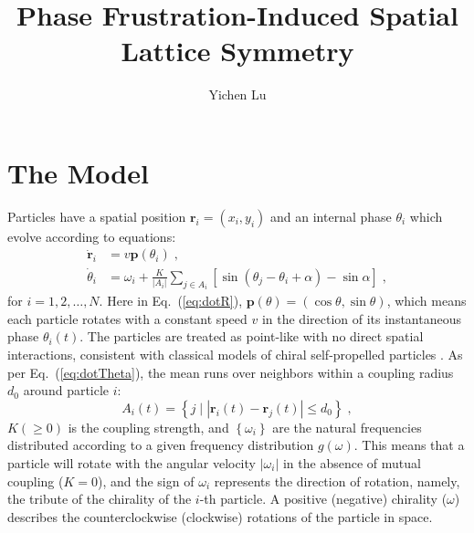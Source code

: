 \documentclass{article}
\title{\textbf{Phase Frustration-Induced Spatial Lattice Symmetry}}
\author{Yichen Lu}
\begin{document}
\maketitle

\tableofcontents

\section{The Model}

Particles have a spatial position $\mathbf{r}_i=\left( x_i, y_i \right)$ and an internal phase $\theta_i$ which evolve according to equations:
\begin{subequations} 
    \label{eq:totalDynamicsMeanField}
    \begin{align}
        \dot{\mathbf{r}}_i&=v\mathbf{p}\left( \theta _i \right)\;\label{eq:dotR},
        \\
        \dot{\theta}_i&=\omega _i+\frac{K}{\left| A_i \right|}\sum_{j\in A_i}{\left[ \sin \left( \theta _j-\theta _i+\alpha \right) -\sin \alpha \right]}\;\label{eq:dotTheta},
    \end{align}
\end{subequations}
for $i=1,2,\ldots,N$. Here in Eq.~(\ref{eq:dotR}), $\mathbf{p}\left( \theta \right) =\left( \cos \theta ,\sin \theta \right)$, which means each particle rotates with a constant speed $v$ in the direction of its instantaneous phase $\theta_i (t)$. 
The particles are treated as point-like with no direct spatial interactions, consistent with classical models of chiral self-propelled particles \cite{PhysRevResearch.1.023026,PhysRevLett.119.058002,Fruchart2021,PhysRevLett.127.238001,PhysRevLett.133.258302}.
As per Eq.~(\ref{eq:dotTheta}), the mean runs over neighbors within a coupling radius $d_0$ around particle $i$:
\begin{equation}
    A_i\left( t \right) =\left\{ j\mid \left| \mathbf{r}_i\left( t \right) -\mathbf{r}_j\left( t \right) \right|\leqslant d_0 \right\} \;,
\end{equation}
$K \left(\geqslant 0\right)$ is the coupling strength, and $\left\{\omega_i\right\}$ are the natural frequencies distributed according to a given frequency distribution $g\left(\omega\right)$. 
This means that a particle will rotate with the angular velocity $|\omega_i |$ in the absence of mutual coupling ($K=0$), and the sign of $\omega_i$ represents the direction of rotation, namely, the tribute of the chirality of the $i$-th particle. A positive (negative) chirality ($\omega$) describes the counterclockwise (clockwise) rotations of the particle in space.
\end{document}
